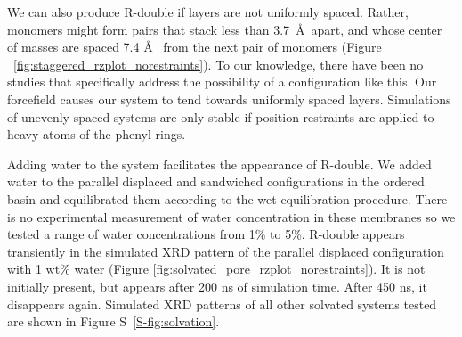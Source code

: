 \documentclass[journal=jpcbfk,manuscript=article]{achemso}
\begin{document}
  We can also produce R-double if layers are not uniformly spaced. Rather, monomers might form 
  pairs that stack less than 3.7~\AA~apart, and whose center of masses are spaced 7.4 \AA~ 
  from the next pair of monomers (Figure ~\ref{fig:staggered_rzplot_norestraints}). To our 
  knowledge, there have been no studies that specifically address the possibility of a
  configuration like this. Our forcefield causes our system to tend towards uniformly spaced
  layers. Simulations of unevenly spaced systems are only stable if position restraints
  are applied to heavy atoms of the phenyl rings.
  
  Adding water to the system facilitates the appearance of R-double. We added water to the 
  parallel displaced and sandwiched configurations in the ordered basin and equilibrated them
  according to the wet equilibration procedure. There is no experimental measurement of 
  water concentration in these membranes so we tested a range of water concentrations from
  1\% to 5\%. R-double appears transiently in the simulated XRD pattern of the parallel 
  displaced configuration with 1 wt\% water (Figure \ref{fig:solvated_pore_rzplot_norestraints}). It is
  not initially present, but appears after 200 ns of simulation time. After 450 ns, it 
  disappears again. Simulated XRD patterns of all other solvated systems tested are shown 
  in Figure S~\ref{S-fig:solvation}.
  
\end{document}
